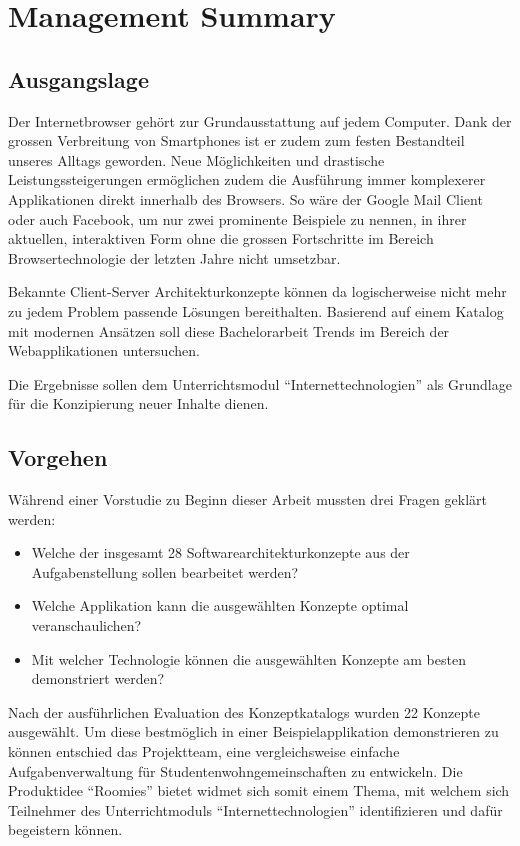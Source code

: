 \chapter{Management Summary}

\section{Ausgangslage}
Der Internetbrowser gehört zur Grundausstattung auf jedem Computer. Dank der grossen Verbreitung von Smartphones ist er zudem zum festen Bestandteil unseres Alltags geworden. Neue Möglichkeiten und drastische Leistungssteigerungen ermöglichen zudem die Ausführung immer komplexerer Applikationen direkt innerhalb des Browsers. So wäre der Google Mail Client oder auch Facebook, um nur zwei prominente Beispiele zu nennen, in ihrer aktuellen, interaktiven Form ohne die grossen Fortschritte im Bereich Browsertechnologie der letzten Jahre nicht umsetzbar.

Bekannte Client-Server Architekturkonzepte können da logischerweise nicht mehr zu jedem Problem passende Lösungen bereithalten. Basierend auf einem Katalog mit modernen Ansätzen soll diese Bachelorarbeit Trends im Bereich der Webapplikationen untersuchen.

Die Ergebnisse sollen dem Unterrichtsmodul ``Internettechnologien'' als Grundlage für die Konzipierung neuer Inhalte dienen.


\section{Vorgehen}

Während einer Vorstudie zu Beginn dieser Arbeit mussten drei Fragen geklärt werden:

\begin{itemize}
	\item Welche der insgesamt 28 Softwarearchitekturkonzepte aus der Aufgabenstellung sollen bearbeitet werden?
	\item Welche Applikation kann die ausgewählten Konzepte optimal veranschaulichen?
	\item Mit welcher Technologie können die ausgewählten Konzepte am besten demonstriert werden?
\end{itemize}

Nach der ausführlichen Evaluation des Konzeptkatalogs wurden 22 Konzepte ausgewählt. Um diese bestmöglich in einer Beispielapplikation demonstrieren zu können entschied das Projektteam, eine vergleichsweise einfache Aufgabenverwaltung für Studentenwohngemeinschaften zu entwickeln. Die Produktidee ``Roomies'' bietet widmet sich somit einem Thema, mit welchem sich Teilnehmer des Unterrichtmoduls ``Internettechnologien'' identifizieren und dafür begeistern können.

